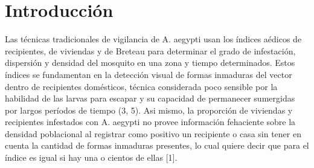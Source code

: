 \section{Introducción}
\label{sec:densidad-vectorial-introduccion}
Las técnicas tradicionales de vigilancia de A. aegypti usan los índices
aédicos de recipientes, de viviendas y de Breteau para determinar el grado
de infestación, dispersión y densidad del mosquito en una zona y tiempo
determinados. Estos índices se fundamentan en la detección visual de formas
inmaduras del vector dentro de recipientes domésticos, técnica considerada
poco sensible por la habilidad de las larvas para escapar y su capacidad de
permanecer sumergidas por largos períodos de tiempo (3, 5). Asi mismo, la
proporción de viviendas y recipientes infestados con A. aegypti no provee
información fehaciente sobre la densidad poblacional al registrar como
positivo un recipiente o casa sin tener en cuenta la cantidad de formas
inmaduras presentes, lo cual quiere decir que para el índice es igual
si hay una o cientos de ellas [1].
